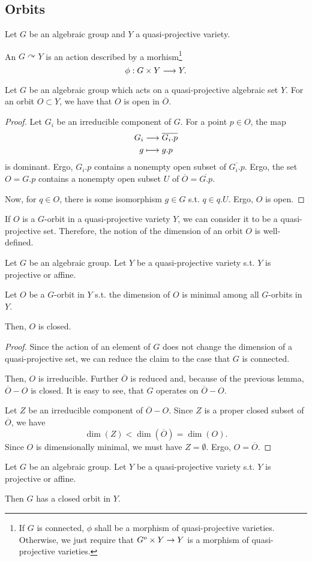 \subsection{Orbits}
\begin{definition}
	Let $G$ be an algebraic group and $Y$ a quasi-projective variety.
	
	An  $G \curvearrowright Y$ is an action described by a morhism\footnote{
If $G$ is connected, $\phi$ shall be a morphism of quasi-projective varieties. Otherwise, we just require that $G^o \times Y \overset{}{\rightarrow} Y$ is a morphism of quasi-projective varieties.
}
	\[ \phi:G \times Y \overset{}{\longrightarrow} Y. \]
\end{definition}
\begin{lemma}
	Let $G$ be an algebraic group which acts on a quasi-projective algebraic set $Y$. For an orbit $O \subset Y$, we have that $O$ is open in $\overline{O}$.
\end{lemma}
\begin{proof}
Let $G_i$ be an irreducible component of $G$. For a point $p \in O$, the map
\begin{align*}
G_i & \overset{}{\longrightarrow} \overline{G_i.p}\\
g & \longmapsto g.p
\end{align*}	
is dominant. Ergo, $G_i.p$ contains a nonempty open subset of $\overline{G_i.p}$. Ergo, the set $O = G.p$ contains a nonempty open subset $U$ of $\overline{O} = \overline{G.p}$.

Now, for $q \in O$, there is some isomorphism $g \in G$ s.t. $q \in q.U$. Ergo, $O$ is open.
\end{proof}

\begin{definition}
	If $O$ is a $G$-orbit in a quasi-projective variety $Y$, we can consider it to be a quasi-projective set. Therefore, the notion of the dimension of an orbit $O$ is well-defined.
\end{definition}

\begin{lemma}
Let $G$ be an algebraic group. Let $Y$ be a quasi-projective variety s.t. $Y$ is projective or affine.

Let $O$ be a $G$-orbit in $Y$ s.t. the dimension of $O$ is minimal among all $G$-orbits in $Y$.

Then, $O$ is closed.
\end{lemma}
\begin{proof}
	Since the action of an element of $G$ does not change the dimension of a quasi-projective set, we can reduce the claim to the case that $G$ is connected.
	
	Then, $O$ is irreducible. Further $\overline{O}$ is reduced and, because of the previous lemma, $\overline{O} - O$ is closed. It is easy to see, that $G$ operates on $\overline{O} - O$.
	
	Let $Z$ be an irreducible component of $\overline{O} - O$.
	Since $Z$ is a proper closed subset of $\overline{O}$, we have
	\[ \dim(Z) < \dim(\overline{O}) = \dim(O). \]
	Since $O$ is dimensionally minimal, we must have $Z = \emptyset$. Ergo, $O = \overline{O}$.
\end{proof}

\begin{corollary}
Let $G$ be an algebraic group. Let $Y$ be a quasi-projective variety s.t. $Y$ is projective or affine.

Then $G$ has a closed orbit in $Y$.
\end{corollary}
